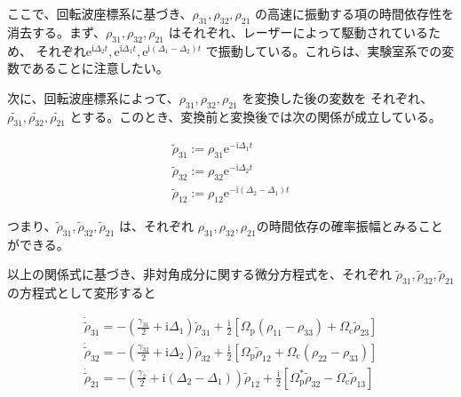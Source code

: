 \documentclass[11pt,a4paper]{ltjsarticle}
\begin{document}



ここで、回転波座標系に基づき、$\rho_{31}, \rho_{32}, \rho_{21}$ の高速に振動する項の時間依存性を
消去する。まず、$\rho_{31}, \rho_{32}, \rho_{21}$ はそれぞれ、レーザーによって駆動されているため、
それぞれ$\mathrm{e}^{\mathrm{i} \Delta_{2} t }, \mathrm{e}^{\mathrm{i} \Delta_{1} t }, \mathrm{e}^{\mathrm{i} \left(\Delta_{1} - \Delta_{2} \right) t }$
で振動している。これらは、実験室系での変数であることに注意したい。

次に、回転波座標系によって、$\rho_{31}, \rho_{32}, \rho_{21}$ を変換した後の変数を
それぞれ、$\tilde {\rho_{31} }, \tilde{ \rho_{32} }, \tilde{ \rho_{21} }$
とする。このとき、変換前と変換後では次の関係が成立している。


\begin{gather*}
  \tilde{\rho}_{31} := \rho_{31}  \mathrm{e}^{- \mathrm{i} \Delta_{1} t} \\
  \tilde{\rho}_{32} := \rho_{32}  \mathrm{e}^{- \mathrm{i} \Delta_{2} t} \\
  \tilde{\rho}_{12} := \rho_{12}  \mathrm{e}^{- \mathrm{i} \left( \Delta_{2} - \Delta_{1} \right) t}
\end{gather*}

つまり、$\tilde {\rho}_{31} , \tilde{ \rho}_{32} , \tilde{ \rho}_{21} $ は、それぞれ
$\rho_{31}, \rho_{32}, \rho_{21}$の時間依存の確率振幅とみることができる。

以上の関係式に基づき、非対角成分に関する微分方程式を、それぞれ  $\tilde {\rho}_{31} , \tilde{ \rho}_{32} , \tilde{ \rho}_{21} $
の方程式として変形すると


\begin{gather*}
  \dot{ \tilde{\rho}}_{31} = - \left( \frac{\gamma_{31}}{2} + \mathrm{i} \Delta_{1} \right) \tilde{\rho}_{31}
                          + \frac{\mathrm{i}}{2} \left[\Omega_{\mathrm{p}} \left( \rho_{11} - \rho_{33} \right) + \Omega_{\mathrm{c}} \tilde{\rho}_{23} \right] \\
  \dot{ \tilde{\rho}}_{32} = - \left( \frac{\gamma_{32}}{2} + \mathrm{i} \Delta_{2} \right) \tilde{\rho}_{32}
                          + \frac{\mathrm{i}}{2} \left[\Omega_{\mathrm{p}} \tilde{\rho}_{12}  + \Omega_{\mathrm{c}} \left( \rho_{22} - \rho_{33} \right) \right] \\
  \dot{ \tilde{\rho}}_{21} = - \left( \frac{\gamma_{2}}{2} + \mathrm{i} \left( \Delta_{2} - \Delta_{1} \right) \right) \tilde{\rho}_{12}
                          + \frac{\mathrm{i}}{2} \left[\Omega_{\mathrm{p}}^* \tilde{\rho}_{32} - \Omega_{\mathrm{c}} \tilde{ \rho }_{13} \right] 
\end{gather*}
\end{document}
